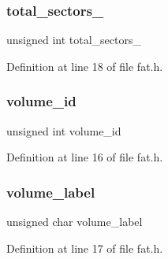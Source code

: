 \subsubsection{\texorpdfstring{total\+\_\+sectors\+\_}{total\_sectors\_32}}
{\footnotesize\ttfamily unsigned int total\+\_\+sectors\+\_}



Definition at line 18 of file fat.\+h.

\mbox{\label{a00152_a35fa9e629267c027e1e46e4b354b6764_a35fa9e629267c027e1e46e4b354b6764}} 
\subsubsection{\texorpdfstring{volume\+\_\+id}{volume\_id}}
{\footnotesize\ttfamily unsigned int volume\+\_\+id}



Definition at line 16 of file fat.\+h.

\mbox{\label{a00152_ac1eef402f95fa102ed4c38f0c791c1c1_ac1eef402f95fa102ed4c38f0c791c1c1}} 
\subsubsection{\texorpdfstring{volume\+\_\+label}{volume\_label}}
{\footnotesize\ttfamily unsigned char volume\+\_\+label}



Definition at line 17 of file fat.\+h.

